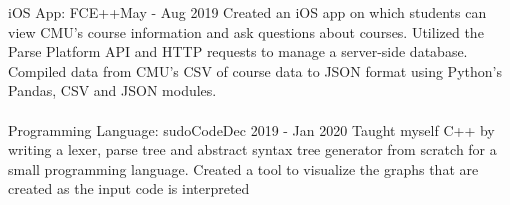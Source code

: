 %
%
%


\begin{projects}

	\project
	{iOS App: FCE++}{May - Aug 2019}
	{
		Created an iOS app on which students can view CMU’s course information and ask questions about courses.  Utilized the Parse Platform API and HTTP requests to manage a server-side database.  Compiled data from CMU’s CSV of course data to JSON format using Python’s Pandas, CSV and JSON modules. \\
    } \\

    \project
	{Programming Language: sudoCode}{Dec 2019 - Jan 2020}
	{
		Taught myself C++ by writing a lexer, parse tree and abstract syntax tree generator from scratch for a small programming language. Created a tool to visualize the graphs that are created as the input code is interpreted
    }

\end{projects}

